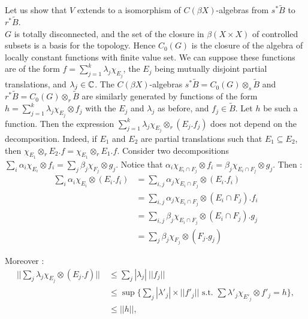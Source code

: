 \begin{dem}
Let us show that $V$ extends to a isomorphism of $C(\beta X)$-algebras from $s^* \tilde B$ to $r^*\tilde B$.\\

$G$ is totally disconnected, and the set of the closure in $\beta (X\times X)$ of controlled subsets is a basis for the topology. Hence $C_0(G)$ is the closure of the algebra of locally constant functions with finite value set. We can suppose these functions are of the form $f = \sum_{j=1}^k \lambda_j\chi_{E_j}$, the $E_j$ being mutually disjoint partial translations, and $\lambda_j\in \mathbb C$. The $C(\beta X)$-algebras $s^* \tilde B = C_0(G) \otimes_s \tilde B$ and $r^* \tilde B = C_0(G) \otimes_r \tilde B$ are similarly generated by functions of the form $h = \sum_{j=1}^k \lambda_j\chi_{E_j}\otimes f_j$ with the $E_j$ and $\lambda_j$ as before, and $f_j\in\tilde B$. Let $h$ be such a function. Then the expression $\sum_{j=1}^k \lambda_j\chi_{E_j}\otimes_r (E_j.f_j)$ does not depend on the decomposition. Indeed, if $E_1$ and $E_2$ are partial translations such that $E_1\subseteq E_2$, then $\chi_{E_1} \otimes_r E_2.f = \chi_{E_1} \otimes_r E_1.f $. Consider two decompositions $\sum_{i} \alpha_i\chi_{E_i}\otimes f_i= \sum_{j} \beta_j\chi_{F_j}\otimes g_j$. Notice that $\alpha_i \chi_{E_i\cap F_j }\otimes f_i = \beta_j \chi_{E_i\cap F_j }\otimes g_j$. Then :
\[ \begin{array}{rl}
  \sum_{i} \alpha_i\chi_{E_i}\otimes (E_i.f_i)  & = \sum_{i,j} \alpha_j\chi_{E_i\cap F_j}\otimes (E_i.f_i)         \\
						& = \sum_{i,j} \alpha_j\chi_{E_i\cap F_j}\otimes (E_i\cap F_j).f_i \\
						& = \sum_{i,j} \beta_j\chi_{E_i\cap F_j}\otimes (E_i\cap F_j).g_j  \\
						& = \sum_{j} \beta_j\chi_{F_j}\otimes (F_j.g_j)
\end{array}\]

Moreover :
\[ \begin{array}{rl} 
||\sum_j \lambda_j\chi_{E_j}\otimes(E_j.f)|| 
 \ & \leq \sum_j |\lambda_j|\ ||f_j|| \\ 
 \ & \leq \sup \{ \sum_j |\lambda'_j| \times  ||f'_j||\text{ s.t. }\sum \lambda'_j \chi_{E'_j}\otimes f'_j  =h\}, \\ 
\ & \leq ||h||, \\
\end{array}\]


\end{dem}
